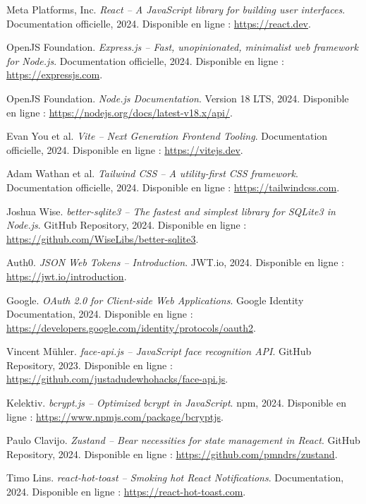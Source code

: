 \begin{enumerate}[label={[\arabic*]}, resume]

\item Meta Platforms, Inc. \textit{React -- A JavaScript library for building user interfaces}. Documentation officielle, 2024. Disponible en ligne : \url{https://react.dev}.

\item OpenJS Foundation. \textit{Express.js -- Fast, unopinionated, minimalist web framework for Node.js}. Documentation officielle, 2024. Disponible en ligne : \url{https://expressjs.com}.

\item OpenJS Foundation. \textit{Node.js Documentation}. Version 18 LTS, 2024. Disponible en ligne : \url{https://nodejs.org/docs/latest-v18.x/api/}.

\item Evan You et al. \textit{Vite -- Next Generation Frontend Tooling}. Documentation officielle, 2024. Disponible en ligne : \url{https://vitejs.dev}.

\item Adam Wathan et al. \textit{Tailwind CSS -- A utility-first CSS framework}. Documentation officielle, 2024. Disponible en ligne : \url{https://tailwindcss.com}.

\item Joshua Wise. \textit{better-sqlite3 -- The fastest and simplest library for SQLite3 in Node.js}. GitHub Repository, 2024. Disponible en ligne : \url{https://github.com/WiseLibs/better-sqlite3}.

\item Auth0. \textit{JSON Web Tokens -- Introduction}. JWT.io, 2024. Disponible en ligne : \url{https://jwt.io/introduction}.

\item Google. \textit{OAuth 2.0 for Client-side Web Applications}. Google Identity Documentation, 2024. Disponible en ligne : \url{https://developers.google.com/identity/protocols/oauth2}.

\item Vincent Mühler. \textit{face-api.js -- JavaScript face recognition API}. GitHub Repository, 2023. Disponible en ligne : \url{https://github.com/justadudewhohacks/face-api.js}.

\item Kelektiv. \textit{bcrypt.js -- Optimized bcrypt in JavaScript}. npm, 2024. Disponible en ligne : \url{https://www.npmjs.com/package/bcryptjs}.

\item Paulo Clavijo. \textit{Zustand -- Bear necessities for state management in React}. GitHub Repository, 2024. Disponible en ligne : \url{https://github.com/pmndrs/zustand}.

\item Timo Lins. \textit{react-hot-toast -- Smoking hot React Notifications}. Documentation, 2024. Disponible en ligne : \url{https://react-hot-toast.com}.

\end{enumerate}

